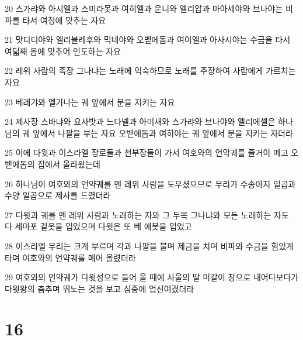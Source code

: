 \par 20 스가랴와 아시엘과 스미라못과 여히엘과 운니와 엘리압과 마아세야와 브나야는 비파를 타서 여청에 맞추는 자요
\par 21 맛디디야와 엘리블레후와 믹네야와 오벧에돔과 여이엘과 아사시야는 수금을 타서 여덟째 음에 맞추어 인도하는 자요
\par 22 레위 사람의 족장 그나냐는 노래에 익숙하므로 노래를 주장하여 사람에게 가르치는 자요
\par 23 베레갸와 엘가나는 궤 앞에서 문을 지키는 자요
\par 24 제사장 스바냐와 요사밧과 느다넬과 아미새와 스가랴와 브나야와 엘리에셀은 하나님의 궤 앞에서 나팔을 부는 자요 오벧에돔과 여히야는 궤 앞에서 문을 지키는 자더라
\par 25 이에 다윗과 이스라엘 장로들과 천부장들이 가서 여호와의 언약궤를 즐거이 메고 오벧에돔의 집에서 올라왔는데
\par 26 하나님이 여호와의 언약궤를 멘 레위 사람을 도우셨으므로 무리가 수송아지 일곱과 수양 일곱으로 제사를 드렸더라
\par 27 다윗과 궤를 멘 레위 사람과 노래하는 자와 그 두목 그나냐와 모든 노래하는 자도 다 세마포 겉옷을 입었으며 다윗은 또 베 에봇을 입었고
\par 28 이스라엘 무리는 크게 부르며 각과 나팔을 불며 제금을 치며 비파와 수금을 힘있게 타며 여호와의 언약궤를 메어 올렸더라
\par 29 여호와의 언약궤가 다윗성으로 들어 올 때에 사울의 딸 미갈이 창으로 내어다보다가 다윗왕의 춤추며 뛰노는 것을 보고 심중에 업신여겼더라

\chapter{16}

